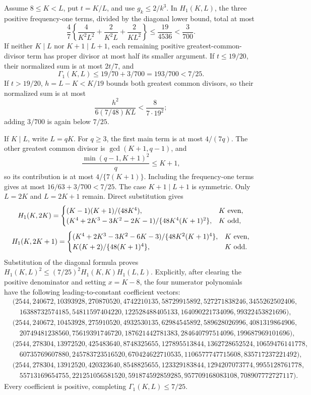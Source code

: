 Assume \(8\leq K<L\), put \(t=K/L\), and use \(g_k\leq2/k^3\).  In \(H_1(K,L)\), the three positive frequency-one terms, divided by the diagonal lower bound, total at most
\[
 \frac47\left\{\frac4{K^2L^2}+\frac2{K^2L}+\frac2{KL^2}\right\}
 \leq\frac{19}{4536}<\frac3{700}.
\]
If neither \(K\mid L\) nor \(K+1\mid L+1\), each remaining positive greatest-common-divisor term has proper divisor at most half its smaller argument.  If \(t\leq19/20\), their normalized sum is at most \(2t/7\), and
\[
 \Gamma_1(K,L)\leq19/70+3/700=193/700<7/25.
\]
If \(t>19/20\), \(h=L-K<K/19\) bounds both greatest common divisors, so their normalized sum is at most
\[
 \frac{h^2}{6(7/48)KL}<\frac8{7\cdot19^2};
\]
adding \(3/700\) is again below \(7/25\).

If \(K\mid L\), write \(L=qK\).  For \(q\geq3\), the first main term is at most \(4/(7q)\).  The other greatest common divisor is \(\gcd(K+1,q-1)\), and
\[
 \frac{\min(q-1,K+1)^2}{q}\leq K+1,
\]
so its contribution is at most \(4/\{7(K+1)\}\).  Including the frequency-one terms gives at most \(16/63+3/700<7/25\).  The case \(K+1\mid L+1\) is symmetric.  Only \(L=2K\) and \(L=2K+1\) remain.  Direct substitution gives
\[
 H_1(K,2K)=
 \begin{cases}
 (K-1)(K+1)/(48K^4),&K\ {\rm even},\\
 (K^4+2K^3-3K^2-2K-1)/\{48K^4(K+1)^2\},&K\ {\rm odd},
 \end{cases}
\]
\[
 H_1(K,2K+1)=
 \begin{cases}
 (K^4+2K^3-3K^2-6K-3)/\{48K^2(K+1)^4\},&K\ {\rm even},\\
 K(K+2)/\{48(K+1)^4\},&K\ {\rm odd}.
 \end{cases}
\]
Substitution of the diagonal formula proves
\(H_1(K,L)^2\leq(7/25)^2H_1(K,K)H_1(L,L)\).  Explicitly, after clearing the positive denominator and setting \(x=K-8\), the four numerator polynomials have the following leading-to-constant coefficient vectors:
\[
\begin{split}
 &(2544,240672,10393928,270870520,4742210135,58729915892,527271838246,3455262502406,\\
 &\quad16388732574185,54811597404220,122528488405133,164090221734096,99322453821696),\\
 &(2544,240672,10453928,275910520,4932530135,62984545892,589628026996,4081319864906,\\
 &\quad20749481238560,75619391746720,187621442781383,284640797514096,199687969101696),\\
 &(2544,278304,13972520,425483640,8748325655,127895513844,1362728652524,10659476141778,\\
 &\quad60735769607880,245783723516520,670424622710535,1106577747715608,835717237221492),\\
 &(2544,278304,13912520,420323640,8548825655,123329183844,1294207073774,9955128761778,\\
 &\quad55713169654755,221251056581520,591874592859285,957709168083108,708907772727117).
\end{split}
\]
Every coefficient is positive, completing \(\Gamma_1(K,L)\leq7/25\).


